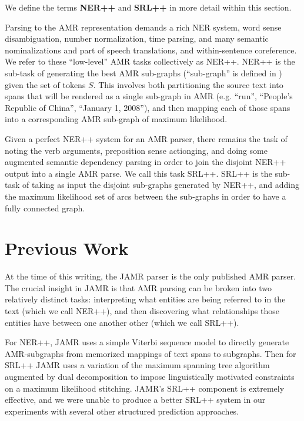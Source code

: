 \documentclass[11pt]{article}
\begin{document}
We define the terms \textbf{NER++} and \textbf{SRL++} in more detail within this section.


Parsing to the AMR representation demands a rich NER system, word sense disambiguation, number normalization, time parsing, and many semantic nominalizations and part of speech translations, and within-sentence coreference. We refer to these ``low-level'' AMR tasks collectively as NER++. NER++ is the sub-task of generating the best AMR sub-graphs (``sub-graph'' is defined in ) given the set of tokens $S$. This involves both partitioning the source text into spans that will be rendered as a single sub-graph in AMR (e.g. ``run'', ``People's Republic of China'', ``January 1, 2008''), and then mapping each of those spans into a corresponding AMR sub-graph of maximum likelihood.


Given a perfect NER++ system for an AMR parser, there remains the task of noting the verb arguments, preposition sense actionging, and doing some augmented semantic dependency parsing in order to join the disjoint NER++ output into a single AMR parse. We call this task SRL++. SRL++ is the sub-task of taking as input the disjoint sub-graphs generated by NER++, and adding the maximum likelihood set of arcs between the sub-graphs in order to have a fully connected graph.

\section{Previous Work}

At the time of this writing, the JAMR parser \cite{Flanigan:14} is the only published AMR parser.
The crucial insight in JAMR is that AMR parsing can be broken into two relatively distinct tasks: interpreting what entities are being referred to in the text (which we call NER++), and then discovering what relationships those entities have between one another other (which we call SRL++).

For NER++, JAMR uses a simple Viterbi sequence model to directly generate AMR-subgraphs from memorized mappings of text spans to subgraphs. Then for SRL++ JAMR uses a variation of the maximum spanning tree algorithm augmented by dual decomposition to impose linguistically motivated constraints on a maximum likelihood stitching. JAMR's SRL++ component is extremely effective, and we were unable to produce a better SRL++ system in our experiments with several other structured prediction approaches.
\end{document}
